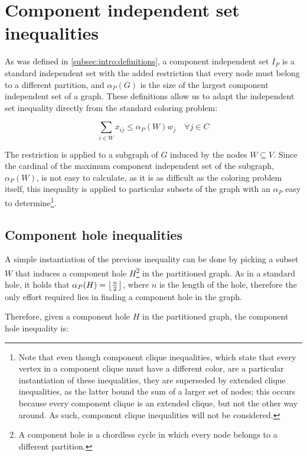 \section{Component independent set inequalities}

As was defined in \ref{subsec:intro:definitions}, a component independent set $I_P$ is a standard independent set with the added restriction that every node must belong to a different partition, and $\alpha_P(G)$ is the size of the largest component independent set of a graph. These definitions allow us to adapt the independent set inequality directly from the standard coloring problem:

\begin{equation}
\label{ineq:ciset}
\sum _{i \in W} x_{ij} \leq \alpha_P(W) w_{j} \quad \forall j \in C
\end{equation}

The restriction is applied to a subgraph of $G$ induced by the nodes $W \subseteq V$. Since the cardinal of the maximum component independent set of the subgraph, $\alpha_P(W)$, is not easy to calculate, as it is as difficult as the coloring problem itself, this inequality is applied to particular subsets of the graph with an $\alpha_P$ easy to determine\footnote{Note that even though component clique inequalities, which state that every vertex in a component clique must have a different color, are a particular instantiation of these inequalities, they are superseded by extended clique inequalities, as the latter bound the sum of a larger set of nodes; this occurs because every component clique is an extended clique, but not the other way around. As such, component clique inequalities will not be considered.}.

\subsection{Component hole inequalities}

A simple instantiation of the previous inequality can be done by picking a subset $W$ that induces a component hole $H$\footnote{A component hole is a chordless cycle in which every node belongs to a different partition.} in the partitioned graph. As in a standard hole, it holds that $\alpha_P(H) = \left\lfloor \frac{n}{2} \right\rfloor$, where $n$ is the length of the hole, therefore the only effort required lies in finding a component hole in the graph.

Therefore, given a component hole $H$ in the partitioned graph, the component hole inequality is:

